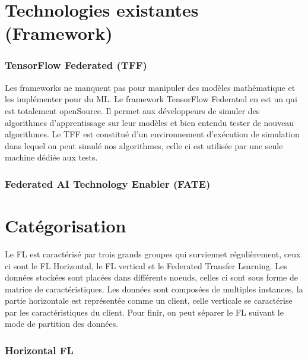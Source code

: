 \documentclass[12pt,a4paper]{report}
\begin{document}
	








 

 


 

\pagebreak

\chapter{Technologies existantes (Framework)}
\subsection{TensorFlow Federated (TFF)}

Les frameworks ne manquent pas pour manipuler des modèles mathématique et les implémenter pour du ML. Le framework TensorFlow Federated en est un qui est totalement openSource. Il permet aux développeurs de simuler des algorithmes d'apprentissage sur leur modèles et bien entendu tester de nouveau algorithmes. Le TFF est constitué d'un environnement d'exécution de simulation dans lequel on peut simulé nos algorithmes, celle ci est utilisée par une seule machine dédiée aux tests.

\subsection{Federated AI Technology Enabler (FATE)}

\chapter{Catégorisation}

Le FL est caractérisé par trois grands groupes qui surviennet régulièrement, ceux ci sont le FL Horizontal, le FL vertical et le Federated Transfer Learning. Les données stockées sont placées dans différents noeuds, celles ci sont sous forme de matrice de caractéristiques. Les données sont composées de multiples instances, la partie horizontale est représentée comme un client, celle verticale se caractérise par les caractéristiques du client. Pour finir, on peut séparer le FL suivant le mode de partition des données.\\

\subsection{Horizontal FL}
\end{document}
